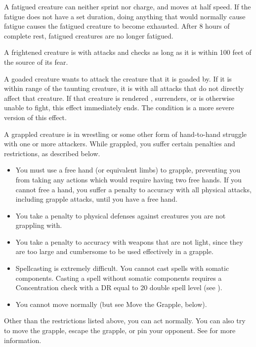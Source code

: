  A fatigued creature can neither sprint nor charge, and moves at half speed. If the fatigue does not have a set duration, doing anything that would normally cause fatigue causes the fatigued creature to become exhausted. After 8 hours of complete rest, fatigued creatures are no longer fatigued.

 A frightened creature is \severelyimpaired with attacks and checks as long as it is within 100 feet of the source of its fear.

 A goaded creature wants to attack the creature that it is goaded by.
If it is within \rngmed range of the taunting creature, it is \impaired with all attacks that do not directly affect that creature.
If that creature is rendered \helpless, surrenders, or is otherwise unable to fight, this effect immediately ends.
The  condition is a more severe version of this effect.

 A grappled creature is in wrestling or some other form of hand-to-hand struggle with one or more attackers. While grappled, you suffer certain penalties and restrictions, as described below.

\begin{itemize}
    \item You must use a free hand (or equivalent limbs) to grapple, preventing you from taking any actions which would require having two free hands. If you cannot free a hand, you suffer a  penalty to accuracy with all physical attacks, including grapple attacks, until you have a free hand.
    \item You take a  penalty to physical defenses against creatures you are not grappling with.
    \item You take a  penalty to accuracy with weapons that are not light, since they are too large and cumbersome to be used effectively in a grapple.
    \item Spellcasting is extremely difficult. You cannot cast spells with somatic components. Casting a spell without somatic components requires a Concentration check with a DR equal to 20 \add double spell level (see ).
    \item You cannot move normally (but see Move the Grapple, below).
\end{itemize}

Other than the restrictions listed above, you can act normally. You can also try to move the grapple, escape the grapple, or pin your opponent. See  for more information.

